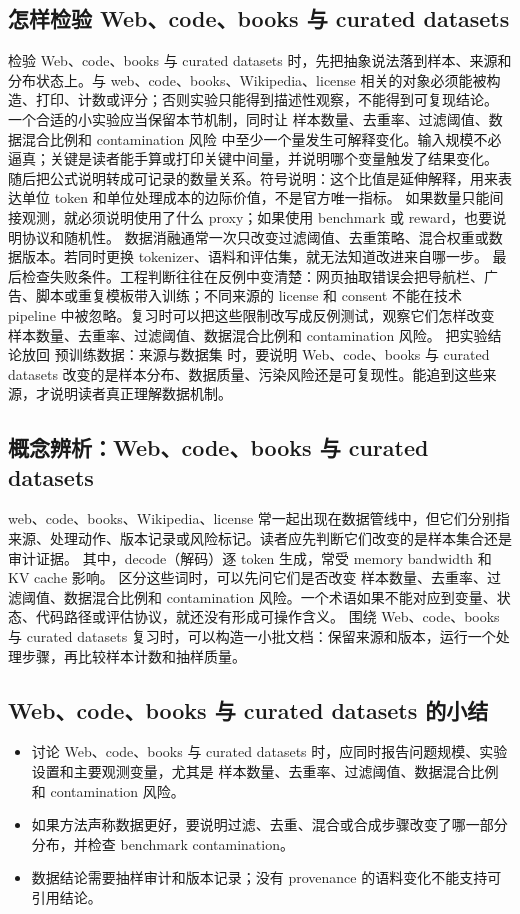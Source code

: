 \documentclass[a4paper]{article}
\begin{document}
\subsection{怎样检验 Web、code、books 与 curated datasets}
检验 Web、code、books 与 curated datasets 时，先把抽象说法落到样本、来源和分布状态上。与 web、code、books、Wikipedia、license 相关的对象必须能被构造、打印、计数或评分；否则实验只能得到描述性观察，不能得到可复现结论。
一个合适的小实验应当保留本节机制，同时让 样本数量、去重率、过滤阈值、数据混合比例和 contamination 风险 中至少一个量发生可解释变化。输入规模不必逼真；关键是读者能手算或打印关键中间量，并说明哪个变量触发了结果变化。
随后把公式说明转成可记录的数量关系。符号说明：这个比值是延伸解释，用来表达单位 token 和单位处理成本的边际价值，不是官方唯一指标。 如果数量只能间接观测，就必须说明使用了什么 proxy；如果使用 benchmark 或 reward，也要说明协议和随机性。
数据消融通常一次只改变过滤阈值、去重策略、混合权重或数据版本。若同时更换 tokenizer、语料和评估集，就无法知道改进来自哪一步。
最后检查失败条件。工程判断往往在反例中变清楚：网页抽取错误会把导航栏、广告、脚本或重复模板带入训练；不同来源的 license 和 consent 不能在技术 pipeline 中被忽略。复习时可以把这些限制改写成反例测试，观察它们怎样改变 样本数量、去重率、过滤阈值、数据混合比例和 contamination 风险。
把实验结论放回 预训练数据：来源与数据集 时，要说明 Web、code、books 与 curated datasets 改变的是样本分布、数据质量、污染风险还是可复现性。能追到这些来源，才说明读者真正理解数据机制。
\subsection{概念辨析：Web、code、books 与 curated datasets}
web、code、books、Wikipedia、license 常一起出现在数据管线中，但它们分别指来源、处理动作、版本记录或风险标记。读者应先判断它们改变的是样本集合还是审计证据。
其中，decode（解码）逐 token 生成，常受 memory bandwidth 和 KV cache 影响。
区分这些词时，可以先问它们是否改变 样本数量、去重率、过滤阈值、数据混合比例和 contamination 风险。一个术语如果不能对应到变量、状态、代码路径或评估协议，就还没有形成可操作含义。
围绕 Web、code、books 与 curated datasets 复习时，可以构造一小批文档：保留来源和版本，运行一个处理步骤，再比较样本计数和抽样质量。
\subsection{Web、code、books 与 curated datasets 的小结}
\begin{itemize}
\item 讨论 Web、code、books 与 curated datasets 时，应同时报告问题规模、实验设置和主要观测变量，尤其是 样本数量、去重率、过滤阈值、数据混合比例和 contamination 风险。
\item 如果方法声称数据更好，要说明过滤、去重、混合或合成步骤改变了哪一部分分布，并检查 benchmark contamination。
\item 数据结论需要抽样审计和版本记录；没有 provenance 的语料变化不能支持可引用结论。
\end{itemize}
\end{document}
